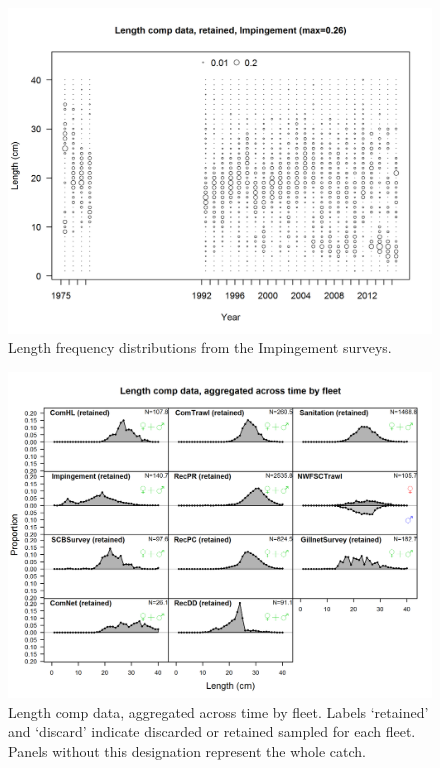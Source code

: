 \documentclass[12pt,]{article}
\begin{document}
\begin{figure}[htbp]
\centering
\includegraphics{r4ss/plots_mod1/comp_lendat_bubflt10mkt2.png}
\caption{Length frequency distributions from the Impingement surveys.
\label{fig:Fleet10_comp_lendat_bubflt10mkt2}}
\end{figure}

\FloatBarrier

\begin{figure}[htbp]
\centering
\includegraphics{r4ss/plots_mod1/comp_lendat__aggregated_across_time.png}
\caption{Length comp data, aggregated across time by fleet. Labels
`retained' and `discard' indicate discarded or retained sampled for each
fleet. Panels without this designation represent the whole catch.
\label{fig:comp_lendat_aggregated_across_time}}
\end{figure}
\end{document}
